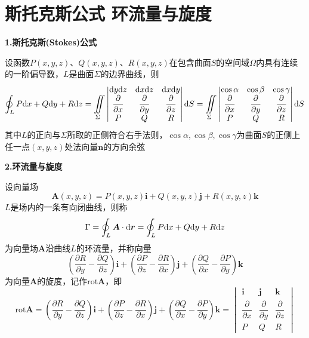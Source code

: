 \section{斯托克斯公式 \quad 环流量与旋度}
\textbf{1.斯托克斯(Stokes)公式}

设函数$P(x,y,z)$、$Q(x,y,z)$、$R(x,y,z)$在包含曲面$S$的空间域$\Omega$内具有连续的一阶偏导数，$L$是曲面$\Sigma$的边界曲线，则
\begin{equation*}
    \oint_{L}P\mathrm{d} x+Q\mathrm{d} y+R\mathrm{d} z=\iint \limits_{\Sigma}
    \begin{vmatrix}
        \mathrm{d} y\mathrm{d} z & \mathrm{d} x\mathrm{d} z & \mathrm{d} x\mathrm{d} y \\
        \dfrac{\partial}{\partial x} & \dfrac{\partial}{\partial y} & \dfrac{\partial}{\partial z} \\
        P & Q & R
    \end{vmatrix}
    \mathrm{d} S
    = \iint \limits_{\Sigma}
    \begin{vmatrix}
        \cos\alpha & \cos\beta & \cos\gamma \\
        \dfrac{\partial}{\partial x} & \dfrac{\partial}{\partial y} & \dfrac{\partial}{\partial z} \\
        P & Q & R
    \end{vmatrix}
    \mathrm{d} S
\end{equation*}
其中$L$的正向与$\Sigma$所取的正侧符合右手法则，$\cos\alpha,\cos\beta,\cos\gamma$为曲面$S$的正侧上任一点$(x,y,z)$处法向量$\bm{n}$的方向余弦

\textbf{2.环流量与旋度}

设向量场
\begin{equation*}
    \bm{A}(x,y,z)=P(x,y,z)\bm{i}+Q(x,y,z)\bm{j}+R(x,y,z)\bm{k}
\end{equation*}
$L$是场内的一条有向闭曲线，则称
\begin{equation*}
    \Gamma=\oint_{L}\bm{A}\cdot\mathrm{d} \bm{r}=\oint_{L}P\mathrm{d} x+Q\mathrm{d} y+R\mathrm{d} z
\end{equation*}
为向量场$\bm{A}$沿曲线$L$的环流量，并称向量
\begin{equation*}
    \left(\frac{\partial R}{\partial y}-\frac{\partial Q}{\partial z}\right)\bm{i}+\left(\frac{\partial P}{\partial z}-\frac{\partial R}{\partial x}\right)\bm{j}+\left(\frac{\partial Q}{\partial x}-\frac{\partial P}{\partial y}\right)\bm{k}
\end{equation*}
为向量$\bm{A}$的旋度，记作$\text{rot}\bm{A}$，即
\begin{equation*}
    \text{rot}\bm{A}=\left(\frac{\partial R}{\partial y}-\frac{\partial Q}{\partial z}\right)\bm{i}+\left(\frac{\partial P}{\partial z}-\frac{\partial R}{\partial x}\right)\bm{j}+\left(\frac{\partial Q}{\partial x}-\frac{\partial P}{\partial y}\right)\bm{k}=
    \begin{vmatrix}
        \bm{i} & \bm{j} & \bm{k} \\
        \dfrac{\partial}{\partial x} & \dfrac{\partial}{\partial y} & \dfrac{\partial}{\partial z} \\
        P & Q & R
    \end{vmatrix}
\end{equation*}

